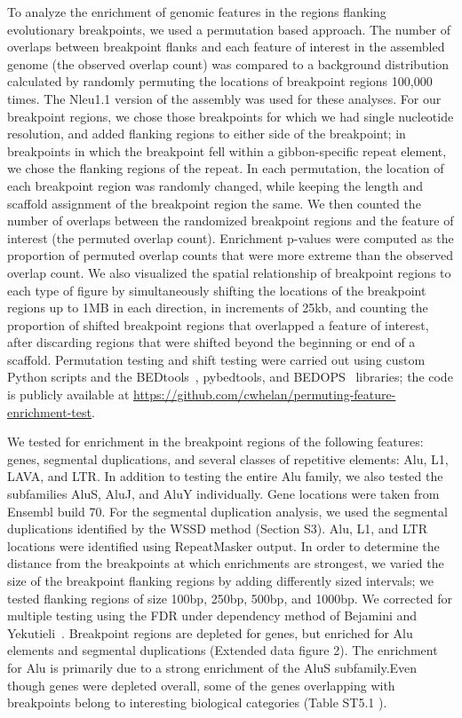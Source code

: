 To analyze the enrichment of genomic features in the regions flanking evolutionary breakpoints, we used a permutation based approach. The number of overlaps between breakpoint flanks and each feature of interest in the assembled genome (the observed overlap count) was compared to a background distribution calculated by randomly permuting the locations of breakpoint regions 100,000 times. The Nleu1.1 version of the assembly was used for these analyses. For our breakpoint regions, we chose those breakpoints for which we had single nucleotide resolution, and added flanking regions to either side of the breakpoint; in breakpoints in which the breakpoint fell within a gibbon-specific repeat element, we chose the flanking regions of the repeat. In each permutation, the location of each breakpoint region was randomly changed, while keeping the length and scaffold assignment of the breakpoint region the same. We then counted the number of overlaps between the randomized breakpoint regions and the feature of interest (the permuted overlap count). Enrichment p-values were computed as the proportion of permuted overlap counts that were more extreme than the observed overlap count. We also visualized the spatial relationship of breakpoint regions to each type of figure by simultaneously shifting the locations of the breakpoint regions up to 1MB in each direction, in increments of 25kb, and counting the proportion of shifted breakpoint regions that overlapped a feature of interest, after discarding regions that were shifted beyond the beginning or end of a scaffold. Permutation testing and shift testing were carried out using custom Python scripts and the BEDtools~\cite{Quinlan:2010km}, pybedtools\cite{Dale:2011cl}, and BEDOPS~\cite{Neph:2012kq} libraries; the code is publicly available at \url{https://github.com/cwhelan/permuting-feature-enrichment-test}.

We tested for enrichment in the breakpoint regions of the following features: genes, segmental duplications, and several classes of repetitive elements: Alu, L1, LAVA, and LTR. In addition to testing the entire Alu family, we also tested the subfamilies AluS, AluJ, and AluY individually. Gene locations were taken from Ensembl build 70. For the segmental duplication analysis, we used the segmental duplications identified by the WSSD method (Section S3). Alu, L1, and LTR locations were identified using RepeatMasker output. In order to determine the distance from the breakpoints at which enrichments are strongest, we varied the size of the breakpoint flanking regions by adding differently sized intervals; we tested flanking regions of size 100bp, 250bp, 500bp, and 1000bp. We corrected for multiple testing using the FDR under dependency method of Bejamini and Yekutieli~\cite{Benjamini:2001fs}. Breakpoint regions are depleted for genes, but enriched for Alu elements and segmental duplications (Extended data figure 2). The enrichment for Alu is primarily due to a strong enrichment of the AluS subfamily.Even though genes were depleted overall, some of the genes overlapping with breakpoints belong to interesting biological categories (Table ST5.1 ).

